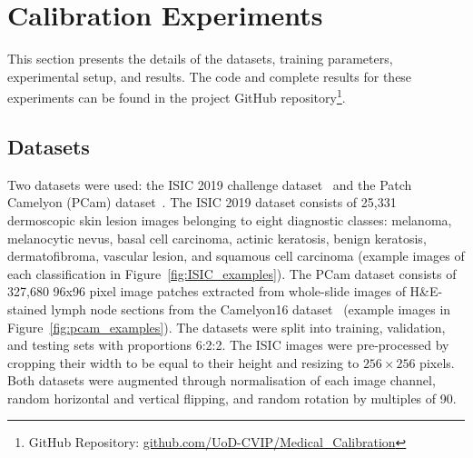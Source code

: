 \section{Calibration Experiments}
\label{sec:calibration_experiments}
This section presents the details of the datasets, training parameters, experimental setup, and results. The code and complete results for these experiments can be found in the project GitHub repository\footnote{GitHub Repository: \url{github.com/UoD-CVIP/Medical_Calibration}}.

\subsection{Datasets}
Two datasets were used: the ISIC 2019 challenge dataset~\citep{codella2018skin,combalia2019bcn20000,tschandl2018ham10000} and the Patch Camelyon (PCam) dataset~\citep{veeling2018rotation}. The ISIC 2019 dataset consists of 25,331 dermoscopic skin lesion images belonging to eight diagnostic classes: melanoma, melanocytic nevus, basal cell carcinoma, actinic keratosis, benign keratosis, dermatofibroma, vascular lesion, and squamous cell carcinoma (example images of each classification in Figure~\ref{fig:ISIC_examples}). The PCam dataset consists of 327,680 96x96 pixel image patches extracted from whole-slide images of H\&E-stained lymph node sections from the Camelyon16 dataset~\citep{bejnordi2017diagnostic} (example images in Figure~\ref{fig:pcam_examples}). The datasets were split into training, validation, and testing sets with proportions 6:2:2. The ISIC images were pre-processed by cropping their width to be equal to their height and resizing to $256 \times 256$ pixels. Both datasets were augmented through normalisation of each image channel, random horizontal and vertical flipping, and random rotation by multiples of 90\textdegree.

